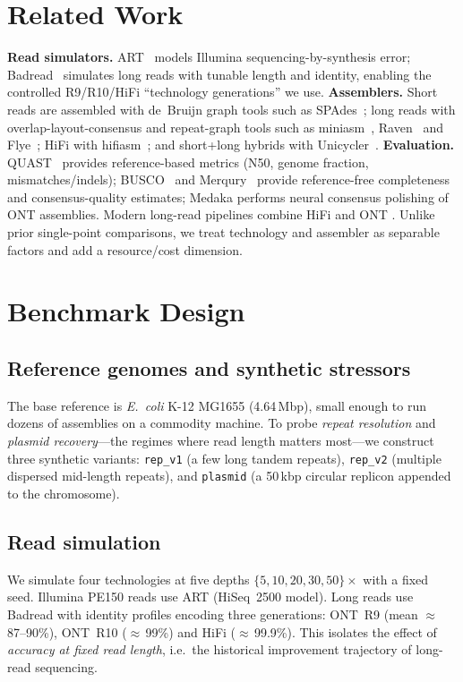 \documentclass[runningheads]{llncs}
\begin{document}
\section{Related Work}
\textbf{Read simulators.} ART~\cite{art} models Illumina sequencing-by-synthesis
error; Badread~\cite{badread} simulates long reads with tunable length and
identity, enabling the controlled R9/R10/HiFi ``technology generations'' we
use. \textbf{Assemblers.} Short reads are assembled with de~Bruijn graph tools
such as SPAdes~\cite{spades}; long reads with overlap-layout-consensus and
repeat-graph tools such as miniasm~\cite{miniasm}, Raven~\cite{raven} and
Flye~\cite{flye}; HiFi with hifiasm~\cite{hifiasm}; and short+long hybrids with
Unicycler~\cite{unicycler}. \textbf{Evaluation.} QUAST~\cite{quast} provides
reference-based metrics (N50, genome fraction, mismatches/indels);
BUSCO~\cite{busco} and Merqury~\cite{merqury} provide reference-free
completeness and consensus-quality estimates; Medaka performs neural consensus
polishing of ONT assemblies. Modern long-read pipelines combine HiFi and ONT
\cite{verkko}. Unlike prior single-point comparisons, we treat technology and
assembler as separable factors and add a resource/cost dimension.

\section{Benchmark Design}
\label{sec:design}

\subsection{Reference genomes and synthetic stressors}
The base reference is \emph{E.\ coli} K-12 MG1655 (4.64\,Mbp), small enough to
run dozens of assemblies on a commodity machine. To probe \emph{repeat
resolution} and \emph{plasmid recovery}---the regimes where read length
matters most---we construct three synthetic variants: \texttt{rep\_v1} (a few
long tandem repeats), \texttt{rep\_v2} (multiple dispersed mid-length repeats),
and \texttt{plasmid} (a 50\,kbp circular replicon appended to the chromosome).

\subsection{Read simulation}
We simulate four technologies at five depths $\{5,10,20,30,50\}\times$ with a
fixed seed. Illumina PE150 reads use ART (HiSeq~2500 model). Long reads use
Badread with identity profiles encoding three generations:
ONT~R9 (mean $\approx$\,87--90\%), ONT~R10 ($\approx$\,99\%) and HiFi
($\approx$\,99.9\%). This isolates the effect of \emph{accuracy at fixed read
length}, i.e.\ the historical improvement trajectory of long-read sequencing.
\end{document}
